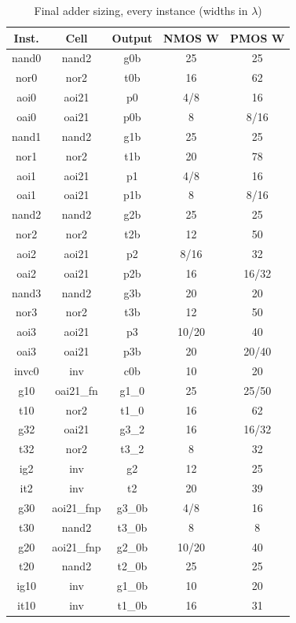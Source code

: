 \documentclass[conference,a4paper]{IEEEtran}
\begin{document}
\begin{table}[H]\centering\scriptsize
\caption{Final adder sizing, every instance (widths in $\lambda$)}
\label{tab:sizing}
\begin{tabular}{|c|c|c|c|c|}\hline
Inst. & Cell & Output & NMOS W & PMOS W \\ \hline
nand0 & nand2 & g0b & 25 & 25 \\ \hline
nor0 & nor2 & t0b & 16 & 62 \\ \hline
aoi0 & aoi21 & p0 & 4/8 & 16 \\ \hline
oai0 & oai21 & p0b & 8 & 8/16 \\ \hline
nand1 & nand2 & g1b & 25 & 25 \\ \hline
nor1 & nor2 & t1b & 20 & 78 \\ \hline
aoi1 & aoi21 & p1 & 4/8 & 16 \\ \hline
oai1 & oai21 & p1b & 8 & 8/16 \\ \hline
nand2 & nand2 & g2b & 25 & 25 \\ \hline
nor2 & nor2 & t2b & 12 & 50 \\ \hline
aoi2 & aoi21 & p2 & 8/16 & 32 \\ \hline
oai2 & oai21 & p2b & 16 & 16/32 \\ \hline
nand3 & nand2 & g3b & 20 & 20 \\ \hline
nor3 & nor2 & t3b & 12 & 50 \\ \hline
aoi3 & aoi21 & p3 & 10/20 & 40 \\ \hline
oai3 & oai21 & p3b & 20 & 20/40 \\ \hline
invc0 & inv & c0b & 10 & 20 \\ \hline
g10 & oai21\_fn & g1\_0 & 25 & 25/50 \\ \hline
t10 & nor2 & t1\_0 & 16 & 62 \\ \hline
g32 & oai21 & g3\_2 & 16 & 16/32 \\ \hline
t32 & nor2 & t3\_2 & 8 & 32 \\ \hline
ig2 & inv & g2 & 12 & 25 \\ \hline
it2 & inv & t2 & 20 & 39 \\ \hline
g30 & aoi21\_fnp & g3\_0b & 4/8 & 16 \\ \hline
t30 & nand2 & t3\_0b & 8 & 8 \\ \hline
g20 & aoi21\_fnp & g2\_0b & 10/20 & 40 \\ \hline
t20 & nand2 & t2\_0b & 25 & 25 \\ \hline
ig10 & inv & g1\_0b & 10 & 20 \\ \hline
it10 & inv & t1\_0b & 16 & 31 \\ \hline

\end{tabular}
\end{table}
\end{document}
